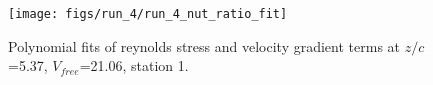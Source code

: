 \begin{figure}[H]
\centering
\texttt{[image: figs/run\_4/run\_4\_nut\_ratio\_fit]}
\caption{Polynomial fits of reynolds stress and velocity gradient terms at $z/c$=5.37, $V_{free}$=21.06, station 1.}
\label{fig:run_4_nut_ratio_fit}
\end{figure}


